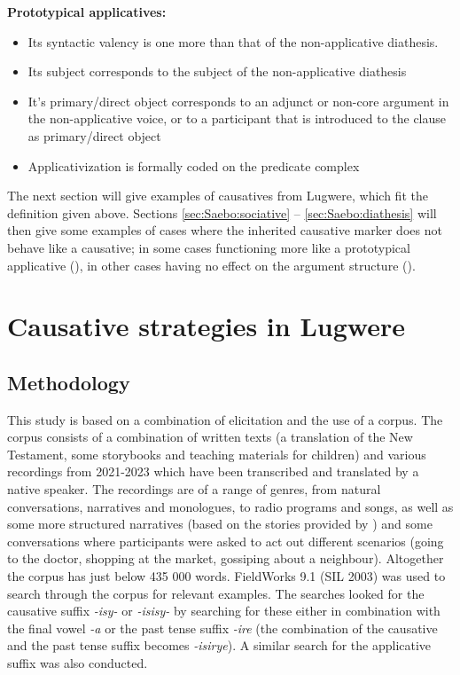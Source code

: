 \documentclass[output=paper,colorlinks,citecolor=brown,draftmode]{langscibook}
\begin{document}
\ea 
\textbf{Prototypical applicatives:}
\begin{itemize}
    \item Its syntactic valency is one more than that of the non-applicative diathesis.
    \item Its subject corresponds to the subject of the non-applicative diathesis
    \item It's primary/direct object corresponds to an adjunct or non-core argument in the non-applicative voice, or to a participant that is introduced to the clause as primary/direct object
    \item Applicativization is formally coded on the predicate complex 
\end{itemize}
\z 

The next section will give examples of causatives from Lugwere, which fit the definition given above. Sections \ref{sec:Saebo:sociative} -- \ref{sec:Saebo:diathesis} will then give some examples of cases where the inherited causative marker does not behave like a causative; in some cases functioning more like a prototypical applicative (), in other cases having no effect on the argument structure ().

\section{Causative strategies in Lugwere}\label{sec:Saebo:Lugwere}
\subsection{Methodology} \label{sec:Saebo:methodology}

This study is based on a combination of elicitation and the use of a corpus. The corpus consists of a combination of written texts (a translation of the New Testament, some storybooks and teaching materials for children) and various recordings from 2021-2023 which have been transcribed and translated by a native speaker. The recordings are of a range of genres, from natural conversations, narratives and monologues, to radio programs and songs, as well as some more structured narratives (based on the stories provided by \cite{Storyboards}) and some conversations where participants were asked to act out different scenarios (going to the doctor, shopping at the market, gossiping about a neighbour). Altogether the corpus has just below 435 000 words. FieldWorks 9.1 (SIL 2003) was used to search through the corpus for relevant examples. The searches looked for the causative suffix \emph{-isy-} or \emph{-isisy-} by searching for these either in combination with the final vowel \emph{-a} or the past tense suffix \emph{-ire} (the combination of the causative and the past tense suffix becomes \emph{-isirye}). A similar search for the applicative suffix was also conducted. 
\end{document}
